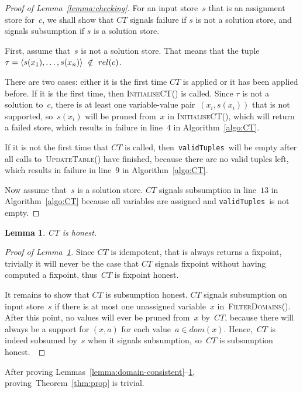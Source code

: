 \documentclass[a4paper,11pt]{article}
\newtheorem{lemma}[theorem]{Lemma}
\newcommand{\Algoref}[1]{Algorithm~\ref{#1}}
\newcommand{\Thmref}[1]{Theorem~\ref{#1}}
\newcommand{\Lemmaref}[1]{Lemma~\ref{#1}}
\newcommand{\CurrTable}{\texttt{validTuples}}
\def\UpdateTable{\textsc{UpdateTable}}
\def\FilterDomains{\textsc{FilterDomains}}
\def\InitialiseCT{\textsc{InitialiseCT}}
\numberwithin{equation}{section}
\begin{document}
\begin{proof}[Proof of \Lemmaref{lemma:checking}]
  For an input store~$s$ that is an assignment store for~$c$,
  we shall show that $CT$
  signals failure if $s$ is not a solution store, and signals subsumption if
  $s$ is a solution store. 

  First, assume that~$s$ is not a solution store. That means that the tuple
  $\tau = \left\langle s(x_1),\ldots,s(x_n)\right\rangle~\notin~rel(c)$.
 
  There are two cases: either
  it is the first time $CT$ is applied or it has been applied before.
  If it is the first time, then \InitialiseCT() is called.
  Since $\tau$ is not a solution to~$c$, there is at least one variable-value
  pair~$(x_i,s(x_i))$ that is not supported, so~$s(x_i)$ will be pruned
  from~$x$ in \InitialiseCT(), which will return a failed store, which results
  in failure in line~$4$ in \Algoref{algo:CT}.

  If it is not the first time that $CT$ is called, then~\CurrTable~will be empty
  after all calls to~\UpdateTable() have finished, because there are no
  valid tuples left, which results in failure in line~$9$ in \Algoref{algo:CT}.
  
  Now assume that~$s$ is a solution store. 
  $CT$ signals subsumption in line~$13$ in \Algoref{algo:CT} because all
  variables are assigned and \CurrTable~is not empty.
\end{proof}

\begin{lemma}\label{lemma:honest}
  CT is honest.
\end{lemma}

\begin{proof}[Proof of \Lemmaref{lemma:honest}]
  Since $CT$ is idempotent, that is always returns a fixpoint,
  trivially it will never be the case that
  $CT$ signals fixpoint without having computed a fixpoint, thus~$CT$ is
  fixpoint honest.
  
  It remains to show that $CT$ is subsumption honest. 
  $CT$ signals subsumption on input store~$s$ if there is at most one
  unassigned variable~$x$ in~\FilterDomains(). After this point, no values will
  ever be pruned from~$x$ by~$CT$, because there will always be a support for
  $(x,a)$ for each value~$a \in dom(x)$. Hence,~$CT$ is indeed subsumed by~$s$
  when it signals subsumption, so~$CT$ is subsumption honest.~\end{proof}

After proving Lemmas~\ref{lemma:domain-consistent}--\ref{lemma:honest},
proving~\Thmref{thm:prop} is trivial.
\end{document}
